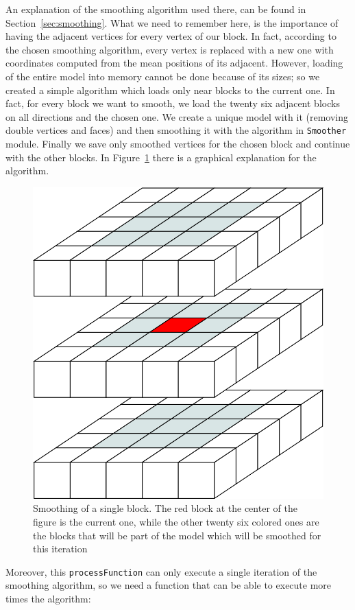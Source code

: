 \documentclass[11pt,oneside]{article}	%
\begin{document}
An explanation of the smoothing algorithm used there, can be found in Section~\ref{sec:smoothing}. What we need to remember here, is the importance of having the adjacent vertices for every vertex of our block. In fact, according to the chosen smoothing algorithm, every vertex is replaced with a new one with coordinates computed from the mean positions of its adjacent. However, loading of the entire model into memory cannot be done because of its sizes; so we created a simple algorithm which loads only near blocks to the current one.
In fact, for every block we want to smooth, we load the twenty six adjacent blocks on all directions and the chosen one. We create a unique model with it (removing double vertices and faces) and then smoothing it with the algorithm in \texttt{Smoother} module. Finally we save only smoothed vertices for the chosen block and continue with the other blocks. In Figure~\ref{fig:SmoothingBlocks} there is a graphical explanation for the algorithm.

\begin{figure}[htb] %
   \centering
   \includegraphics[width=0.30\linewidth]{images/SmoothingBlocks.png}
   \caption{Smoothing of a single block. The red block at the center of the figure is the current one, while the other twenty six colored ones are the blocks that will be part of the model which will be smoothed for this iteration}
   \label{fig:SmoothingBlocks}
\end{figure}

Moreover, this \texttt{processFunction} can only execute a single iteration of the smoothing algorithm, so we need a function that can be able to execute more times the algorithm:
\end{document}
